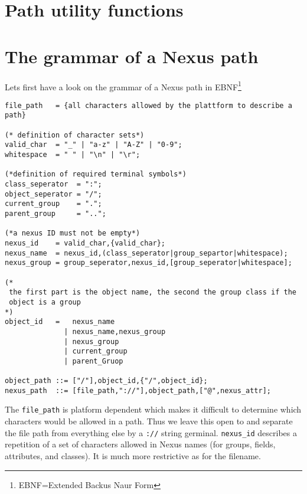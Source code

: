 \section{Path utility functions}

\section{The grammar of a Nexus path}
Lets first have a look on the grammar of a Nexus path in
EBNF\footnote{EBNF=Extended Backus Naur Form}
\begin{verbatim}
file_path   = {all characters allowed by the plattform to describe a path}

(* definition of character sets*)
valid_char  = "_" | "a-z" | "A-Z" | "0-9";
whitespace  = " " | "\n" | "\r";

(*definition of required terminal symbols*)
class_seperator  = ":";
object_seperator = "/";
current_group    = ".";
parent_group     = "..";

(*a nexus ID must not be empty*)
nexus_id    = valid_char,{valid_char}; 
nexus_name  = nexus_id,(class_seperator|group_separtor|whitespace);
nexus_group = group_seperator,nexus_id,[group_seperator|whitespace];

(*
 the first part is the object name, the second the group class if the 
 object is a group
*)
object_id   =   nexus_name    
              | nexus_name,nexus_group 
              | nexus_group   
              | current_group 
              | parent_Gruop  
                                             
object_path ::= ["/"],object_id,{"/",object_id};
nexus_path  ::= [file_path,"://"],object_path,["@",nexus_attr];
\end{verbatim}

The {\tt file\_path} is platform dependent which makes it difficult to determine
which characters would be allowed in a path. Thus we leave this open to and
separate the file path from everything else by a {\tt ://} string germinal.
{\tt nexus\_id} describes a repetition of a set of characters allowed in Nexus
names (for groups, fields, attributes, and classes). It is much more restrictive
as for the filename.
